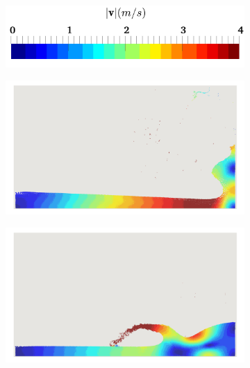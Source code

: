 \begin{figure}[H]
	\centering
	\begin{subfigure}{0.45 \textwidth}	
		\centering
		\includegraphics[width=1.0\textwidth]{images/CFD_DEM/colorBar.png}
	\end{subfigure}
	
	\hspace{-0.2cm}
	\begin{subfigure}{0.45 \textwidth}	
		\centering
		\includegraphics[width=1.0\textwidth]{images/CFD_DEM/cfd_rollup.png}
	\end{subfigure}
	\begin{subfigure}{0.45 \textwidth}
		\centering
		\includegraphics[width=1.0\textwidth]{images/CFD_DEM/cfd_secondSplash.png}
	\end{subfigure}

\end{figure}
